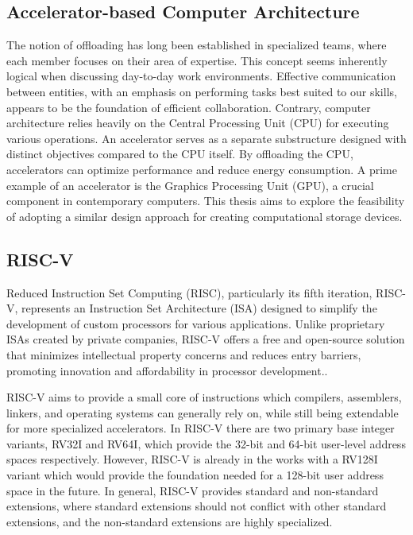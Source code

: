 \subsection{Accelerator-based Computer Architecture}\label{sec:ACA}
The notion of offloading has long been established in specialized teams, where
each member focuses on their area of expertise. This concept seems inherently
logical when discussing day-to-day work environments. Effective communication
between entities, with an emphasis on performing tasks best suited to our
skills, appears to be the foundation of efficient collaboration.
Contrary, computer architecture relies heavily on the Central Processing Unit
(CPU) for executing various operations. An accelerator serves as a separate
substructure designed with distinct objectives compared to the CPU itself. By
offloading the CPU, accelerators can optimize performance and reduce energy
consumption\cite{AA}. A prime example of an accelerator is the Graphics
Processing Unit (GPU), a crucial component in contemporary computers.
This thesis aims to explore the feasibility of adopting a similar design
approach for creating computational storage devices.

\subsection{RISC-V}
Reduced Instruction Set Computing (RISC), particularly its fifth iteration,
RISC-V, represents an Instruction Set Architecture (ISA) designed to simplify
the development of custom processors for various applications. Unlike
proprietary ISAs created by private companies, RISC-V offers a free and
open-source solution that minimizes intellectual property concerns and reduces
entry barriers, promoting innovation and affordability in processor
development.\cite{ISAfree}.

RISC-V aims to provide a small core of instructions which compilers, assemblers,
linkers, and operating systems can generally rely on, while still being
extendable for more specialized accelerators. In RISC-V there are two primary
base integer variants, RV32I and RV64I, which provide the 32-bit and 64-bit
user-level address spaces respectively. However, RISC-V is already in the works
with a RV128I variant which would provide the foundation needed for a 128-bit
user address space in the future. In general, RISC-V provides standard and
non-standard extensions, where standard extensions should not conflict with
other standard extensions, and the non-standard extensions are highly
specialized.

